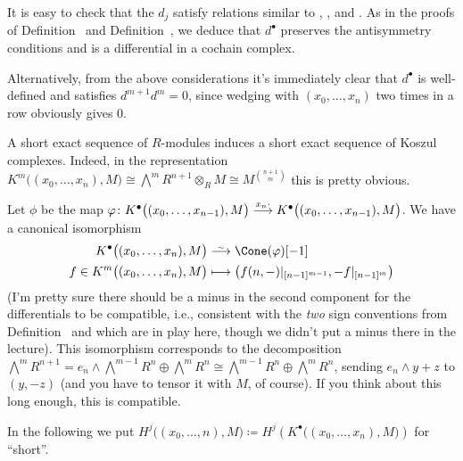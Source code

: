 \documentclass[a4paper,parskip=half,numbers=enddot, DIV=12]{scrreprt}
\begin{document}
\begin{rem}
	\begin{alphanumerate}
		\item {}It is easy to check that the $d_j$ satisfy relations similar to , , and . As in the proofs of Definition~ and Definition~, we deduce that $d^\bullet$ preserves the antisymmetry conditions and is a differential in a cochain complex. 
		
		Alternatively, from the above considerations it's immediately clear that $d^\bullet$ is well-defined and satisfies $d^{m+1}d^m=0$, since wedging with $(x_0,\ldots,x_n)$ two times in a row obviously gives $0$.
		\item A short exact sequence of $R$-modules induces a short exact sequence of Koszul complexes. Indeed, in the representation $K^m\big((x_0,\ldots,x_n),M\big)\cong \bigwedge^mR^{n+1}\otimes_RM\cong M^{\binom{n+1}{m}}$ this is pretty obvious.
		\item Let $\phi$ be the map $\phi\colon K^\bullet\big((x_0,\ldots,x_{n-1}),M\big)\morphism[x_n\cdot]K^\bullet\big((x_0,\ldots,x_{n-1}),M\big)$. We have a canonical isomorphism
		\begin{align}\lbl{eq:KoszulCone}
			\begin{split}
				K^\bullet\big((x_0,\ldots,x_n),M\big)&\isomorphism\Cone(\phi)[-1]\\
				f\in K^m\big((x_0,\ldots,x_n),M\big)&\longmapsto \left(f(n,-)|_{[n-1]^{m-1}}, -f|_{[n-1]^{m}}\right)
			\end{split}			
		\end{align}
		(I'm pretty sure there should be a minus in the second component for the differentials to be compatible, i.e., consistent with the \emph{two} sign conventions from Definition~ and  which are in play here, though we didn't put a minus there in the lecture). This isomorphism corresponds to the decomposition $\bigwedge^mR^{n+1}=e_n\wedge \bigwedge^{m-1}R^n\oplus \bigwedge^mR^n\cong \bigwedge^{m-1}R^n\oplus \bigwedge^mR^n$, sending $e_n\wedge y+z$ to $(y,-z)$ (and you have to tensor it with $M$, of course). If you think about this long enough, this is compatible.
	\end{alphanumerate}
\end{rem}
In the following we put $H^j\big((x_0,\ldots,n),M\big)\coloneqq H^j\left(K^\bullet\big((x_0,\ldots,x_n),M\big)\right)$ for ``short''.
\end{document}
